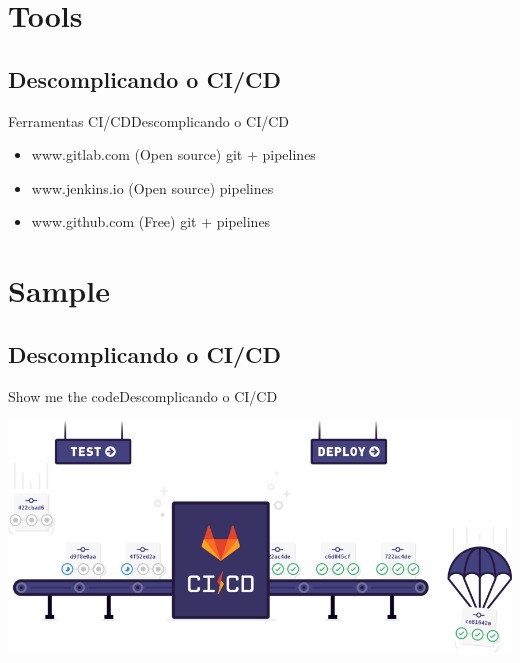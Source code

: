 \documentclass[10pt]{beamer}
\begin{document}
\section{Tools}
\subsection{Descomplicando o CI/CD}
\begin{frame}{Ferramentas CI/CD}{Descomplicando o CI/CD}
    \begin{itemize}
     \item www.gitlab.com (Open source) git + pipelines
     \item www.jenkins.io  (Open source) pipelines
     \item www.github.com (Free) git + pipelines
    \end{itemize}
\end{frame}

\section{Sample}
\subsection{Descomplicando o CI/CD}
\begin{frame}{Show me the code}{Descomplicando o CI/CD}
    \begin{center}
    \includegraphics[scale=0.3]{images/gitlab.png}
    \end{center}
\end{frame}

{\1
\begin{frame}
\end{frame}}
\end{document}
